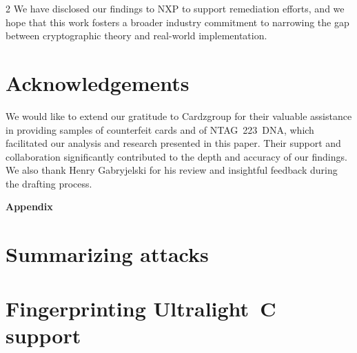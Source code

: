 \documentclass[10pt,letterpaper]{article}
\begin{document}
\begin{multicols}{2}
We have disclosed our findings to NXP to support remediation efforts, and we hope that this work fosters a broader industry commitment to narrowing the gap between cryptographic theory and real-world implementation.

\section*{Acknowledgements}
We would like to extend our gratitude to Cardzgroup for their valuable assistance in providing samples of counterfeit cards and of NTAG~223~DNA, which facilitated our analysis and research presented in this paper. Their support and collaboration significantly contributed to the depth and accuracy of our findings. We also thank Henry Gabryjelski for his review and insightful feedback during the drafting process.
\end{multicols}





\newpage
\appendix
\huge\textbf{Appendix}\normalsize
\section{Summarizing attacks}
\label{app:summary}

\newpage
\section{Fingerprinting Ultralight~C support}
\label{app:fingerprint_ulc}
\end{document}
